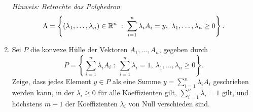 \documentclass{uebung_cs}
\begin{document}
\begin{aufgabe}
\begin{enumerate}
			\textit{Hinweis: Betrachte das Polyhedron
			\[
				\Lambda=\left\{(\lambda_1, \dots , \lambda_n)\in \mathbb{R}^n \;:\; \sum_{i=1}^n\lambda_i A_i = y,\ \lambda_1, \dots , \lambda_n\geq 0\right\}.
			\]}
		\item Sei $P$ die konvexe Hülle der Vektoren $A_1,\dots,A_n$, gegeben durch
			\[
				P=\left\{\sum_{i=1}^n \lambda_i A_i \;:\; \sum_{i=1}^n\lambda_i=1,\ \lambda_1, \dots , \lambda_n\geq 0\right\}.
			\]
			Zeige, dass jedes Element $y\in P$ als eine Summe $y=\sum_{i=1}^n \lambda_i A_i$ geschrieben werden kann, in der $\lambda_i\geq 0$ für alle Koeffizienten gilt, $\sum_{i=1}^n\lambda_i=1$ gilt, und höchstens $m+1$ der Koeffizienten $\lambda_i$ von Null verschieden sind. 
	\end{enumerate}
\end{aufgabe}
\end{document}
